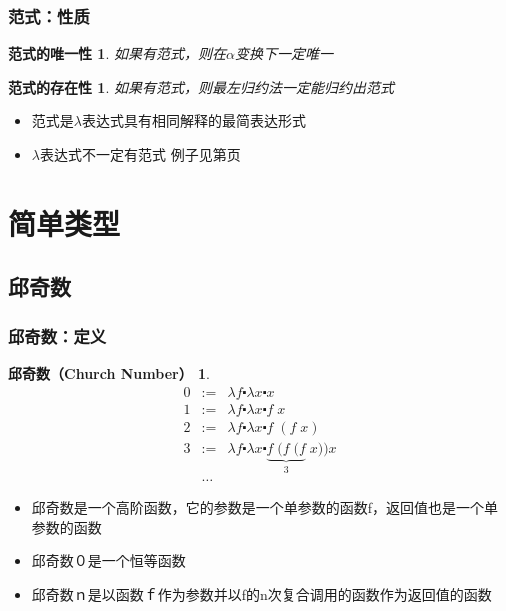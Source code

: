 \documentclass[CJK,compress,hyperref]{beamer}
\begin{document}
\begin{CJK}{UTF8}{song}
\begin{frame}
  \frametitle{范式：性质} 
  \newtheorem{Parad_uniq}{范式的唯一性} 
  \begin{Parad_uniq}
    如果有范式，则在$\alpha$变换下一定唯一 
  \end{Parad_uniq}
  \newtheorem{Parad_exist}{范式的存在性} 
  \begin{Parad_exist}
    如果有范式，则最左归约法一定能归约出范式 
  \end{Parad_exist}
  \begin{itemize}
  \item 范式是$\lambda$表达式具有相同解释的最简表达形式 
  \item $\lambda$表达式不一定有范式 例子见第\pageref{ambig}页
  \end{itemize}
\end{frame} 

\section{简单类型}

\subsection{邱奇数}
\begin{frame}
  \frametitle{邱奇数：定义}
  \newtheorem{churchNo}{邱奇数（Church Number）} 
  \begin{churchNo}
    \begin{eqnarray*}
      0 & := & \lambda f \centerdot \lambda x \centerdot x \\ 
      1 & := & \lambda f \centerdot \lambda x \centerdot f \; x \\ 
      2 & := & \lambda f \centerdot \lambda x \centerdot f \; (f \;x) \\ 
      3 & := & \lambda f \centerdot \lambda x \centerdot \underbrace{f \; (f \; (f}_3 \;x))x \\ 
        & \dots &  
    \end{eqnarray*}  
  \end{churchNo}
  \begin{itemize}
  \item 邱奇数是一个高阶函数，它的参数是一个单参数的函数f，返回值也是一个单参数的函数
  \item 邱奇数０是一个恒等函数
  \item 邱奇数ｎ是以函数ｆ作为参数并以f的n次复合调用的函数作为返回值的函数
  \end{itemize}
\end{frame} 


\end{CJK}
\end{document}
